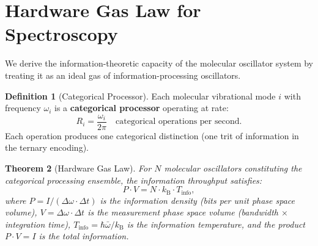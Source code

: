 \documentclass[11pt,twocolumn,a4paper]{article}
\newtheorem{theorem}{Theorem}[section]
\theoremstyle{definition}
\newtheorem{definition}[theorem]{Definition}
\theoremstyle{remark}
\newcommand{\kB}{k_{\mathrm{B}}}
\begin{document}
\section{Hardware Gas Law for Spectroscopy}
\label{sec:hardware_gas}

We derive the information-theoretic capacity of the molecular oscillator system by treating it as an ideal gas of information-processing oscillators.

\begin{definition}[Categorical Processor]
\label{def:cat_processor}
Each molecular vibrational mode $i$ with frequency $\omega_i$ is a \textbf{categorical processor} operating at rate:
\begin{equation}
R_i = \frac{\omega_i}{2\pi} \quad \text{categorical operations per second}.
\end{equation}
Each operation produces one categorical distinction (one trit of information in the ternary encoding).
\end{definition}

\begin{theorem}[Hardware Gas Law]
\label{thm:hardware_gas}
For $N$ molecular oscillators constituting the categorical processing ensemble, the information throughput satisfies:
\begin{equation}
P \cdot V = N \cdot \kB \cdot T_{\mathrm{info}},
\end{equation}
where $P = I / (\Delta\omega \cdot \Delta t)$ is the information density (bits per unit phase space volume), $V = \Delta\omega \cdot \Delta t$ is the measurement phase space volume (bandwidth $\times$ integration time), $T_{\mathrm{info}} = \hbar\bar{\omega}/\kB$ is the information temperature, and the product $P \cdot V = I$ is the total information.
\end{theorem}
\end{document}
